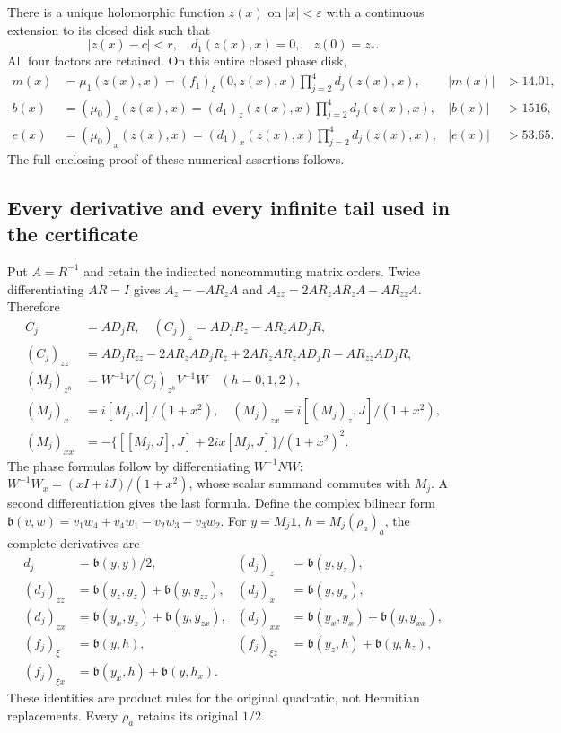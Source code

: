 There is a unique holomorphic function $z(x)$ on $|x|<\varepsilon$
with a continuous extension to its closed disk such that
\[
 |z(x)-c|<r,\quad d_1(z(x),x)=0,\quad z(0)=z_*.
 \tag{UPP3}
\]
All four factors are retained. On this entire closed phase disk,
\[
 \begin{aligned}
 m(x)&=\mu_1(z(x),x)
     =(f_1)_\xi(0,z(x),x)\prod_{j=2}^4d_j(z(x),x),
       &|m(x)|&>14.01,\\
 b(x)&=(\mu_0)_z(z(x),x)
     =(d_1)_z(z(x),x)\prod_{j=2}^4d_j(z(x),x),
       &|b(x)|&>1516,\\
 e(x)&=(\mu_0)_x(z(x),x)
     =(d_1)_x(z(x),x)\prod_{j=2}^4d_j(z(x),x),
       &|e(x)|&>53.65.
 \end{aligned}\tag{UPP4}
\]
The full enclosing proof of these numerical assertions follows.

\subsection{Every derivative and every infinite tail used in the certificate}
Put $A=R^{-1}$ and retain the indicated noncommuting matrix orders.
Twice differentiating $AR=I$ gives
$A_z=-AR_zA$ and $A_{zz}=2AR_zAR_zA-AR_{zz}A$. Therefore
\[
 \begin{aligned}
 C_j&=AD_jR,\quad (C_j)_z=AD_jR_z-AR_zAD_jR,\\
 (C_j)_{zz}&=AD_jR_{zz}-2AR_zAD_jR_z
       +2AR_zAR_zAD_jR-AR_{zz}AD_jR,\\
 (M_j)_{z^h}&=W^{-1}V(C_j)_{z^h}V^{-1}W\quad(h=0,1,2),\\
 (M_j)_x&=i[M_j,J]/(1+x^2),\quad
 (M_j)_{zx}=i[(M_j)_z,J]/(1+x^2),\\
 (M_j)_{xx}&=-\{[[M_j,J],J]+2ix[M_j,J]\}/(1+x^2)^2.
 \end{aligned}\tag{UPP5}
\]
The phase formulas follow by differentiating $W^{-1}NW$:
$W^{-1}W_x=(xI+iJ)/(1+x^2)$, whose scalar summand commutes with
$M_j$. A second differentiation gives the last formula.
Define the complex bilinear form
$\mathfrak b(v,w)=v_1w_4+v_4w_1-v_2w_3-v_3w_2$.
For $y=M_j\mathbf1$, $h=M_j(\rho_a)_a$, the complete derivatives are
\[
 \begin{aligned}
 d_j&=\mathfrak b(y,y)/2,&(d_j)_z&=\mathfrak b(y,y_z),\\
 (d_j)_{zz}&=\mathfrak b(y_z,y_z)+\mathfrak b(y,y_{zz}),&
 (d_j)_x&=\mathfrak b(y,y_x),\\
 (d_j)_{zx}&=\mathfrak b(y_x,y_z)+\mathfrak b(y,y_{zx}),&
 (d_j)_{xx}&=\mathfrak b(y_x,y_x)+\mathfrak b(y,y_{xx}),\\
 (f_j)_\xi&=\mathfrak b(y,h),&
 (f_j)_{\xi z}&=\mathfrak b(y_z,h)+\mathfrak b(y,h_z),\\
 (f_j)_{\xi x}&=\mathfrak b(y_x,h)+\mathfrak b(y,h_x).
 \end{aligned}\tag{UPP6}
\]
These identities are product rules for the original quadratic,
not Hermitian replacements. Every $\rho_a$ retains its original $1/2$.

